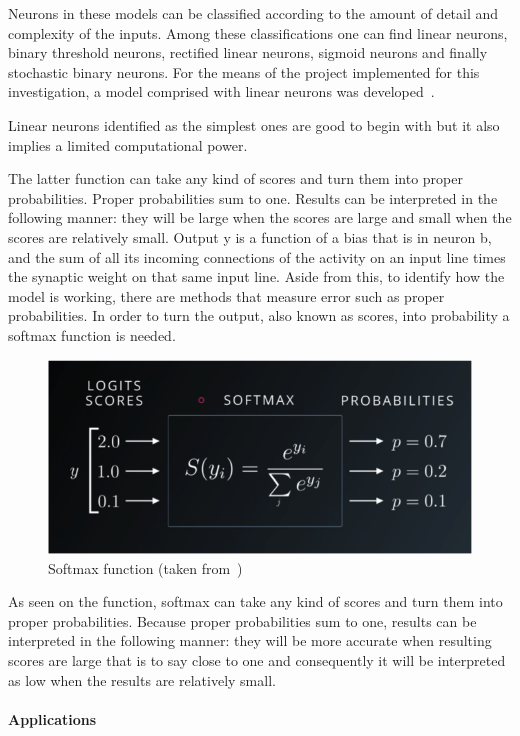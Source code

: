 Neurons in these models can be classified according to the amount of detail and complexity of the inputs. Among these classifications one can find linear neurons, binary threshold neurons, rectified linear neurons, sigmoid neurons and finally stochastic binary neurons. For the means of the project implemented for this investigation, a model comprised with linear neurons was developed~\cite{hinton13}. 

Linear neurons identified as the simplest ones are good to begin with but it also implies a limited computational power.

The latter function can take any kind of scores and turn them into proper probabilities. Proper probabilities sum to one.  Results can be interpreted in the following manner: they will be large when the scores are large and small when the scores are relatively small. 
Output y is a function of a bias that is in neuron b, and the sum of all its incoming connections of the activity on an input line times the synaptic weight on that same input line. Aside from this, to identify how the model is working, there are methods that measure error such as proper probabilities. In order to turn the output, also known as scores, into probability a softmax function is needed.

\begin{figure}[htbp]
  \centering
  \includegraphics[width=\textwidth]{images/softmax}
  \caption{ Softmax function (taken from~\cite{hinton13}) }
  \label{fig:softmax}
\end{figure}

As seen on the  function, softmax can take any kind of scores and turn them into proper probabilities. Because proper probabilities sum to one, results can be interpreted in the following manner: they will be more accurate when resulting scores are large that is to say close to one and consequently it will be interpreted as low when the results are relatively small. 


\paragraph{Applications}




\endinput

